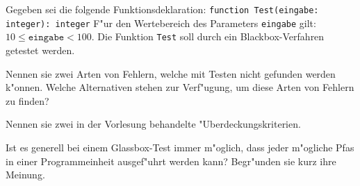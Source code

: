 \documentclass[12pt]{exam}
\begin{document}
\begin{questions}

\question[6] Gegeben sei die folgende Funktionsdeklaration: \lstinline{function Test(eingabe: integer): integer} F"ur den Wertebereich des Parameters \texttt{eingabe} gilt: $10 \leq \texttt{eingabe} < 100$. Die Funktion \texttt{Test} soll durch ein Blackbox-Verfahren getestet werden.
\addpoints
{}

\question[4] Nennen sie zwei Arten von Fehlern, welche mit Testen nicht gefunden werden k"onnen. Welche Alternativen stehen zur Verf"ugung, um diese Arten von Fehlern zu finden?
\addpoints

\question[2] Nennen sie zwei in der Vorlesung behandelte "Uberdeckungskriterien.
\addpoints

\question[2] Ist es generell bei einem Glassbox-Test immer m"oglich, dass jeder m"ogliche Pfas in einer Programmeinheit ausgef"uhrt werden kann? Begr"unden sie kurz ihre Meinung.
\addpoints

\begin{comment}
{%
\renewcommand*\thechoice{\arabic{choice}} 
\renewcommand*\choicelabel{\thechoice)}
%
\question[2] Element with $Z=92$ is:
\begin{multicols}{2}
\begin{choices}
\choice H
\choice O
\choice F
\choice S
\choice Ba
\choice Pb
\choice U
\choice Pu
\end{choices}
\end{multicols}
}%

\question[10]
In no more than one paragraph, explain why the earth is round.
\makeemptybox{2in}

\question[20]
Explain blah, blah\ldots
\makeemptybox{\fill}

\newpage

\question[20]
Explain blah, blah\ldots
\fillwithlines{\fill}

\newpage

\question[20]
Explain blah, blah\ldots
\fillwithdottedlines{8em}
\end{comment}

\end{questions}
\end{document}

